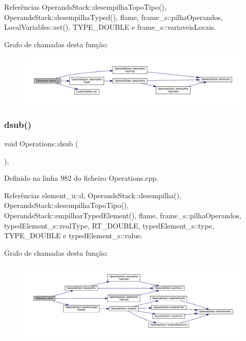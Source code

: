 Referências Operands\+Stack\+::desempilha\+Topo\+Tipo(), Operands\+Stack\+::desempilha\+Typed(), flame, frame\+\_\+s\+::pilha\+Operandos, Local\+Variables\+::set(), T\+Y\+P\+E\+\_\+\+D\+O\+U\+B\+LE e frame\+\_\+s\+::variaveis\+Locais.

Grafo de chamadas desta função\+:
\nopagebreak
\begin{figure}[H]
\begin{center}
\leavevmode
\includegraphics[width=350pt]{classOperations_a161cba32105238617b0cfd5c47afdfe4_cgraph}
\end{center}
\end{figure}
\mbox{\label{classOperations_aa994b0cf4aead2646fa5bb90c2643664}} 
\subsubsection{\texorpdfstring{dsub()}{dsub()}}
{\footnotesize\ttfamily void Operations\+::dsub (\begin{DoxyParamCaption}{ }\end{DoxyParamCaption})\hspace{0.3cm}{\ttfamily [static]}, {\ttfamily [private]}}



Definido na linha 982 do ficheiro Operations.\+cpp.



Referências element\+\_\+u\+::d, Operands\+Stack\+::desempilha(), Operands\+Stack\+::desempilha\+Topo\+Tipo(), Operands\+Stack\+::empilhar\+Typed\+Element(), flame, frame\+\_\+s\+::pilha\+Operandos, typed\+Element\+\_\+s\+::real\+Type, R\+T\+\_\+\+D\+O\+U\+B\+LE, typed\+Element\+\_\+s\+::type, T\+Y\+P\+E\+\_\+\+D\+O\+U\+B\+LE e typed\+Element\+\_\+s\+::value.

Grafo de chamadas desta função\+:
\nopagebreak
\begin{figure}[H]
\begin{center}
\leavevmode
\includegraphics[width=350pt]{classOperations_aa994b0cf4aead2646fa5bb90c2643664_cgraph}
\end{center}
\end{figure}
\mbox{\label{classOperations_a0cba4ff895f2e3908eea5b39305481a4}} 
